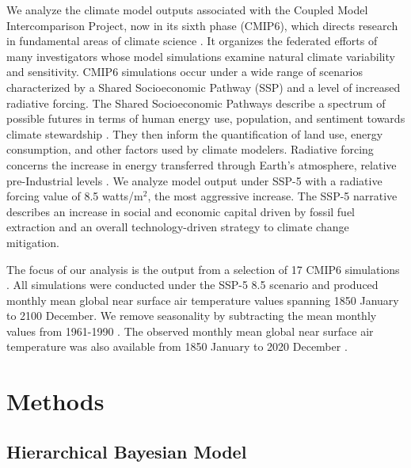 \documentclass{CUP-JNL-EDS}
\begin{document}
We analyze the climate model outputs associated with the Coupled Model Intercomparison Project, now in its sixth phase (CMIP6), which directs research in fundamental areas of climate science \cite{eyring2016overview}. It organizes the federated efforts of many investigators whose model simulations examine natural climate variability and sensitivity. 
%
CMIP6 simulations occur under a wide range of scenarios %
characterized by a Shared Socioeconomic Pathway (SSP) and a level of increased radiative forcing. The Shared Socioeconomic Pathways describe a spectrum of possible futures in terms of human energy use, population, and sentiment towards climate stewardship \cite{riahi2017shared}. They then inform the quantification of land use, energy consumption, and other factors used by climate modelers. Radiative forcing concerns the increase in energy transferred through Earth's atmosphere, relative pre-Industrial levels \cite{change2007climate}. We analyze model output under SSP-5 with a radiative forcing value of 8.5 watts/m$^2$, the most aggressive increase. The SSP-5 narrative describes an increase in social and economic capital driven by fossil fuel extraction and an overall technology-driven strategy to climate change mitigation.

The focus of our analysis is the output from a selection of 17 CMIP6 simulations \cite{access-cm2,access-esm1-5,awi-cm-1-1-mr,bcc-csm2-mr,cams-csm1-0,canesm5,canesm5-canoe,fgoals-g3,giss-e2-1-g,miroc-es2l,miroc6,mpi-esm1-2-hr-DKRZ,mpi-esm1-2-lr,mri-esm2-0,noresm2-lm,noresm2-mm,ukesm1-0-ll-MOHC}. All simulations were conducted under the SSP-5 8.5 scenario and produced monthly mean global near surface air temperature values spanning 1850 January to 2100 December. We remove seasonality by subtracting the mean monthly values from 1961-1990 \cite{jones1999surface}. The observed monthly mean global near surface air temperature was also available from 1850 January to 2020 December \cite{morice2021updated}.


\section[Methods]{Methods}
\subsection{Hierarchical Bayesian Model}
\end{document}
